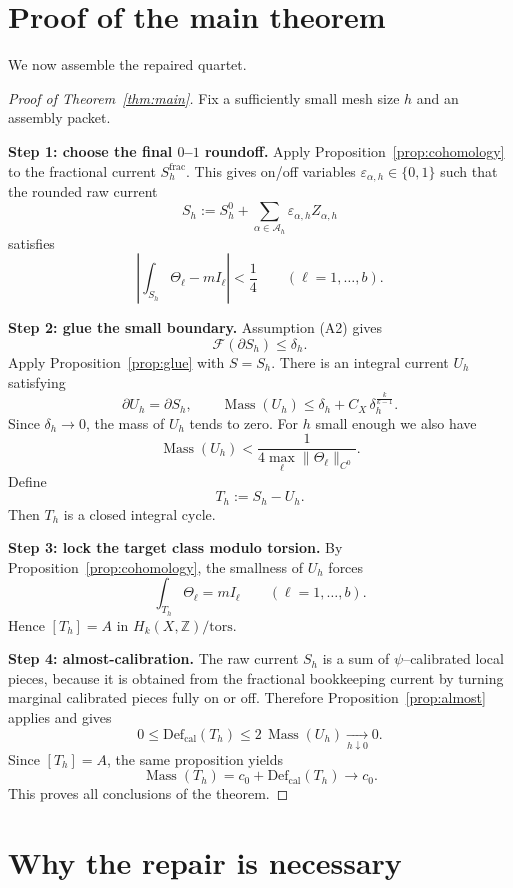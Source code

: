 \documentclass[11pt]{article}
\numberwithin{equation}{section}
\theoremstyle{plain}
\theoremstyle{definition}
\theoremstyle{remark}
\DeclareMathOperator{\Mass}{Mass}
\newcommand{\Z}{\mathbb{Z}}
\newcommand{\calF}{\mathcal{F}}
\newcommand{\calA}{\mathcal{A}}
\newcommand{\Defcal}{\mathrm{Def}_{\mathrm{cal}}}
\begin{document}
\section{Proof of the main theorem}\label{sec:proof-main}

We now assemble the repaired quartet.

\begin{proof}[Proof of Theorem~\ref{thm:main}]
Fix a sufficiently small mesh size $h$ and an assembly packet.

\smallskip\noindent
\textbf{Step 1: choose the final $0$--$1$ roundoff.}
Apply Proposition~\ref{prop:cohomology} to the fractional current $S_h^{\mathrm{frac}}$.  This gives on/off variables $\varepsilon_{\alpha,h}\in\{0,1\}$ such that the rounded raw current
\[
S_h:=S_h^0+\sum_{\alpha\in\calA_h}\varepsilon_{\alpha,h} Z_{\alpha,h}
\]
satisfies
\[
\left|\int_{S_h}\Theta_\ell - mI_\ell\right|<\frac14
\qquad (\ell=1,\dots,b).
\]

\smallskip\noindent
\textbf{Step 2: glue the small boundary.}
Assumption (A2) gives
\[
\calF(\partial S_h)\le \delta_h.
\]
Apply Proposition~\ref{prop:glue} with $S=S_h$.  There is an integral current $U_h$ satisfying
\[
\partial U_h=\partial S_h,
\qquad
\Mass(U_h)\le \delta_h + C_X\,\delta_h^{\frac{k}{k-1}}.
\]
Since $\delta_h\to 0$, the mass of $U_h$ tends to zero.  For $h$ small enough we also have
\[
\Mass(U_h)<\frac{1}{4\max_\ell \|\Theta_\ell\|_{C^0}}.
\]
Define
\[
T_h:=S_h-U_h.
\]
Then $T_h$ is a closed integral cycle.

\smallskip\noindent
\textbf{Step 3: lock the target class modulo torsion.}
By Proposition~\ref{prop:cohomology}, the smallness of $U_h$ forces
\[
\int_{T_h}\Theta_\ell = mI_\ell
\qquad (\ell=1,\dots,b).
\]
Hence $[T_h]=A$ in $H_k(X,\Z)/\mathrm{tors}$.

\smallskip\noindent
\textbf{Step 4: almost-calibration.}
The raw current $S_h$ is a sum of $\psi$--calibrated local pieces, because it is obtained from the fractional bookkeeping current by turning marginal calibrated pieces fully on or off.  Therefore Proposition~\ref{prop:almost} applies and gives
\[
0\le \Defcal(T_h)\le 2\,\Mass(U_h)\xrightarrow[h\downarrow 0]{}0.
\]
Since $[T_h]=A$, the same proposition yields
\[
\Mass(T_h)=c_0+\Defcal(T_h)\to c_0.
\]
This proves all conclusions of the theorem.
\end{proof}

\section{Why the repair is necessary}\label{sec:repair}
\end{document}
